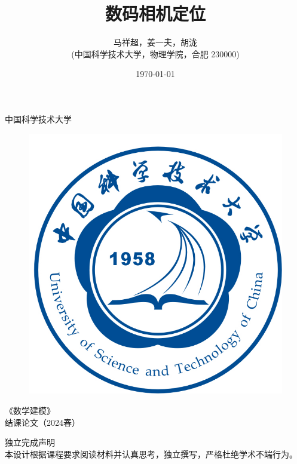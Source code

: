 \documentclass{article}
\title{{\heiti\huge{数码相机定位}}}
\author{\large{马祥超，姜一夫，胡泷}\\(中国科学技术大学，物理学院，合肥 230000)}
\date{\today}
\numberwithin{equation}{section}						%
\numberwithin{figure}{section}							%
\begin{document}
\begin{sloppypar}
	\thispagestyle{empty}
	\begin{center}
		\parbox[t][3cm][c]{\textwidth}{
		\begin{center}
				{\kaishu\Huge 中国科学技术大学}
		\end{center}}
		\parbox[t][8cm][c]{\textwidth}{\huge
		\begin{center} 
				\begin{figure}[H]
					\centering
					\includegraphics[width=0.4\linewidth]{ustcblue}
				\end{figure}
		\end{center} }
		\parbox[t][2cm][t]{\textwidth}{
		\begin{center}  
				{\kaishu\huge 《数学建模》\\结课论文（2024春）}
		\end{center} }
		
		\parbox[t][5cm][b]{0.7\textwidth}{
			{\Large{} }  }
		
		\parbox[t][5cm][c]{\textwidth}{ {\large
		\begin{center}
					{\Large\heiti 独立完成声明}
					\\
					本设计根据课程要求阅读材料并认真思考，独立撰写，严格杜绝学术不端行为。
		\end{center} } }
	\end{center}
	\clearpage
	\maketitle
	

\end{sloppypar}
\end{document}
